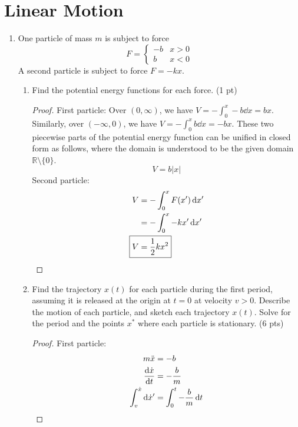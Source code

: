 \documentclass[../psets.tex]{subfiles}
\begin{document}
\section{Linear Motion}
\begin{enumerate}
    \item {}One particle of mass $m$ is subject to force
    \begin{equation*}
        F =
        \begin{cases}
            -b & x>0\\
            b & x<0
        \end{cases}
    \end{equation*}
    A second particle is subject to force $F=-kx$.
    \begin{enumerate}
        \item Find the potential energy functions for each force. (1 pt)
        \begin{proof}
            First particle: Over $(0,\infty)$, we have $V=-\int_0^x-b\dd{x}=bx$. Similarly, over $(-\infty,0)$, we have $V=-\int_0^xb\dd{x}=-bx$. These two piecewise parts of the potential energy function can be unified in closed form as follows, where the domain is understood to be the given domain $\mathbb{R}\setminus\{0\}$.
            \begin{equation*}
                \boxed{V = b|x|}
            \end{equation*}
            Second particle:
            \begin{align*}
                V &= -\int_0^xF(x')\dd{x'}\\
                &= -\int_0^x-kx'\dd{x'}\\
                \Aboxed{V &= \frac{1}{2}kx^2}
            \end{align*}
        \end{proof}
        \item Find the trajectory $x(t)$ for each particle during the first period, assuming it is released at the origin at $t=0$ at velocity $v>0$. Describe the motion of each particle, and sketch each trajectory $x(t)$. Solve for the period and the points $x^*$ where each particle is stationary. (6 pts)
        \begin{proof}
            First particle:
            \begin{align*}
                m\ddot{x} &= -b\\
                \dv{\dot{x}}{t} &= -\frac{b}{m}\\
                \int_v^{\dot{x}}\dd{\dot{x}'} &= \int_0^t-\frac{b}{m}\dd{t}\\

\end{align*}
\end{proof}
\end{enumerate}
\end{enumerate}
\end{document}
